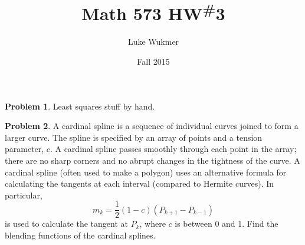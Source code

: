 \documentclass[10pt]{article}
\theoremstyle{plain}
\theoremstyle{definition}
\newtheorem{prob}{Problem}
\numberwithin{equation}{section}
\begin{document}
\title{Math 573 HW\textsuperscript{\#}3}
\author{Luke Wukmer}
\date{Fall 2015}
\maketitle \thispagestyle{empty} %

\begin{prob}
    Least squares stuff by hand.
\end{prob}
\begin{prob}
    A cardinal spline is a sequence of individual curves joined to form a
    larger curve. The spline is specified by an array of points and a tension
    parameter, $c$. A cardinal spline passes smoothly through each point in the
    array; there are no sharp corners and no abrupt changes in the tightness
    of the curve. A cardinal spline (often used to make a polygon) uses an
    alternative formula for calculating the tangents at each interval
    (compared to Hermite curves). In particular, 
    \[
            m_k = \frac{1}{2}(1-c)\left(P_{k+1} - P_{k-1}\right)
        \]
    is used to calculate the tangent at $P_k$, where $c$ is between 0 and 1.
    Find the blending functions of the cardinal splines.
\end{prob}
\end{document}
